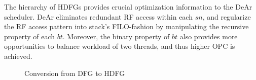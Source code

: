 \indent The hierarchy of HDFGs provides crucial optimization information to the DeAr scheduler.
DeAr eliminates redundant RF access within each $sn$, and regularize the RF access pattern into stack's FILO-fashion by manipulating the recursive property of each $bt$.
Moreover, the binary property of $bt$ also provides more opportunities to balance workload of two threads, and thus higher OPC is achieved.
\vspace{\textfig}
\begin{figure}[!ht]
    \begin{center}
    \end{center}
    \caption{Conversion from DFG to HDFG}
    \label{fig:dfg}
\end{figure}


